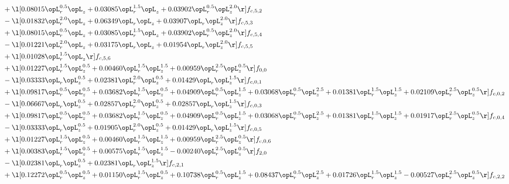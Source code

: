 \begin{alignat}{2}
& + \l[  0.08015 \opL_r^{0.5} \opL_z +  0.03085 \opL_r^{1.5} \opL_z +  0.03902 \opL_r^{0.5} \opL_z^{2.0}  \r] f_{c,5,2} \nonumber \\ 
& - \l[  0.01832 \opL_r^{2.0} \opL_z +  0.06349 \opL_r \opL_z +  0.03907 \opL_r \opL_z^{2.0}  \r] f_{c,5,3} \nonumber \\ 
& + \l[  0.08015 \opL_r^{0.5} \opL_z +  0.03085 \opL_r^{1.5} \opL_z +  0.03902 \opL_r^{0.5} \opL_z^{2.0}  \r] f_{c,5,4} \nonumber \\ 
& - \l[  0.01221 \opL_r^{2.0} \opL_z +  0.03175 \opL_r \opL_z +  0.01954 \opL_r \opL_z^{2.0}  \r] f_{c,5,5} \nonumber \\ 
& + \l[  0.01028 \opL_r^{1.5} \opL_z  \r] f_{c,5,6} \nonumber \\ 
& + \l[  0.01227 \opL_r^{1.5} \opL_z^{0.5} +  0.00460 \opL_r^{1.5} \opL_z^{1.5} +  0.00959 \opL_r^{2.5} \opL_z^{0.5}  \r] f_{0,0} \nonumber \\ 
& - \l[  0.03333 \opL_r \opL_z^{0.5} +  0.02381 \opL_r^{2.0} \opL_z^{0.5} +  0.01429 \opL_r \opL_z^{1.5}  \r] f_{c,0,1} \nonumber \\ 
& + \l[  0.09817 \opL_r^{0.5} \opL_z^{0.5} +  0.03682 \opL_r^{1.5} \opL_z^{0.5} +  0.04909 \opL_r^{0.5} \opL_z^{1.5} +  0.03068 \opL_r^{0.5} \opL_z^{2.5} +  0.01381 \opL_r^{1.5} \opL_z^{1.5} +  0.02109 \opL_r^{2.5} \opL_z^{0.5}  \r] f_{c,0,2} \nonumber \\ 
& - \l[  0.06667 \opL_r \opL_z^{0.5} +  0.02857 \opL_r^{2.0} \opL_z^{0.5} +  0.02857 \opL_r \opL_z^{1.5}  \r] f_{c,0,3} \nonumber \\ 
& + \l[  0.09817 \opL_r^{0.5} \opL_z^{0.5} +  0.03682 \opL_r^{1.5} \opL_z^{0.5} +  0.04909 \opL_r^{0.5} \opL_z^{1.5} +  0.03068 \opL_r^{0.5} \opL_z^{2.5} +  0.01381 \opL_r^{1.5} \opL_z^{1.5} +  0.01917 \opL_r^{2.5} \opL_z^{0.5}  \r] f_{c,0,4} \nonumber \\ 
& - \l[  0.03333 \opL_r \opL_z^{0.5} +  0.01905 \opL_r^{2.0} \opL_z^{0.5} +  0.01429 \opL_r \opL_z^{1.5}  \r] f_{c,0,5} \nonumber \\ 
& + \l[  0.01227 \opL_r^{1.5} \opL_z^{0.5} +  0.00460 \opL_r^{1.5} \opL_z^{1.5} +  0.00959 \opL_r^{2.5} \opL_z^{0.5}  \r] f_{c,0,6} \nonumber \\ 
& + \l[  0.00383 \opL_r^{1.5} \opL_z^{0.5} +  0.00575 \opL_r^{1.5} \opL_z^{1.5}   -0.00240 \opL_r^{2.5} \opL_z^{0.5}  \r] f_{2,0} \nonumber \\ 
& - \l[  0.02381 \opL_r \opL_z^{0.5} +  0.02381 \opL_r \opL_z^{1.5}  \r] f_{c,2,1} \nonumber \\ 
& + \l[  0.12272 \opL_r^{0.5} \opL_z^{0.5} +  0.01150 \opL_r^{1.5} \opL_z^{0.5} +  0.10738 \opL_r^{0.5} \opL_z^{1.5} +  0.08437 \opL_r^{0.5} \opL_z^{2.5} +  0.01726 \opL_r^{1.5} \opL_z^{1.5}   -0.00527 \opL_r^{2.5} \opL_z^{0.5}  \r] f_{c,2,2} \nonumber \\ 

\end{alignat}

